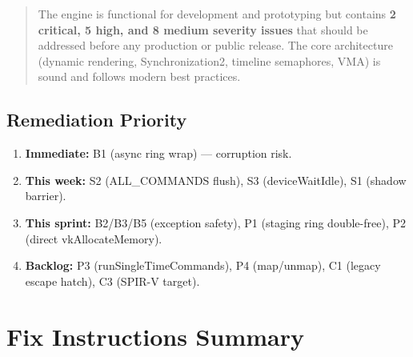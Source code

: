 \documentclass[a4paper,12pt]{article}
\newcommand{\severitybox}[2]{%
  \colorbox{#1}{\makebox[2.5cm][c]{\textcolor{white}{\textbf{#2}}}}%
}
\begin{document}
\medskip
\noindent\severitybox{highcolor}{MODERATE}

\begin{quote}
  The engine is functional for development and prototyping but contains
  \textbf{2 critical, 5 high, and 8 medium severity issues} that should
  be addressed before any production or public release. The core architecture
  (dynamic rendering, Synchronization2, timeline semaphores, VMA) is sound
  and follows modern best practices.
\end{quote}

\subsection*{Remediation Priority}

\begin{enumerate}[noitemsep]
  \item[\textbf{P0}] \textbf{Immediate:} B1 (async ring wrap) — corruption risk.
  \item[\textbf{P1}] \textbf{This week:} S2 (ALL\_COMMANDS flush), S3 (deviceWaitIdle), S1 (shadow barrier).
  \item[\textbf{P2}] \textbf{This sprint:} B2/B3/B5 (exception safety), P1 (staging ring double-free), P2\\(direct vkAllocateMemory).
  \item[\textbf{P3}] \textbf{Backlog:} P3 (runSingleTimeCommands), P4 (map/unmap), C1 (legacy escape hatch), C3 (SPIR-V target).
\end{enumerate}

\newpage

\section{Fix Instructions Summary}
\end{document}
